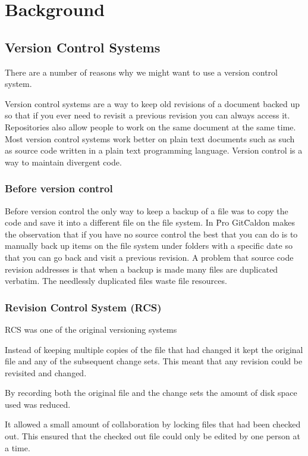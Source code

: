 \chapter{Background}

\section{Version Control Systems}
There are a number of reasons why we might want to use a version control system.

Version control systems are a way to keep old revisions of a document backed up so that if you ever need to revisit a previous revision you can always access it.
Repositories also allow people to work on the same document at the same time.
Most version control systems work better on plain text documents such as such as source code written in a plain text programming language.
Version control is a way to maintain divergent code.


\subsection{Before version control}
Before version control the only way to keep a backup of a file was to copy the code and save it into a different file on the file system.
In \"Pro Git\" Caldon makes the observation that if you have no source control the best that you can do is to manually back up items on the file system under folders with a specific date so that you can go back and visit a previous revision.  A problem that source code revision addresses is that when a backup is made many files are duplicated verbatim.  The needlessly duplicated files waste file resources.

\subsection{Revision Control System (RCS)}
RCS was one of the original versioning systems 

Instead of keeping multiple copies of the file that had changed it kept the original file and any of the subsequent change sets.
This meant that any revision could be revisited and changed.

By recording both the original file and the change sets the amount of disk space used was reduced. 

It allowed a small amount of collaboration by locking files that had been checked out.
This ensured that the checked out file could only be edited by one person at a time.

